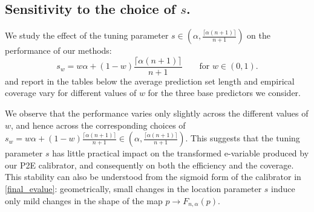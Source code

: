 \documentclass{article}
\theoremstyle{plain}
\theoremstyle{definition}
\theoremstyle{remark}
\begin{document}
\subsection{Sensitivity to the choice of \(s\).}
We study the effect of the tuning parameter
$s\in\left(\alpha,\frac{\lceil \alpha(n+1)\rceil}{n+1}\right)$
on the performance of our methods: 
\[
s_w
=
w\alpha
+
(1-w)
\frac{\lceil \alpha(n+1)\rceil}{n+1}\qquad \text{for \(w\in(0,1)\)}.
\]
and report in the tables below the average prediction set length and empirical coverage vary for different values of $w$ for the three base predictors we consider. 

We observe that the performance varies only slightly across the different values of \(w\), and hence across the corresponding choices of
$s_w
=
w\alpha
+
(1-w)\frac{\lceil \alpha(n+1)\rceil}{n+1}
\in
\left(\alpha,\frac{\lceil \alpha(n+1)\rceil}{n+1}\right).$
This suggests that the tuning parameter \(s\) has little practical impact on the transformed e-variable produced by our P2E calibrator, and consequently on both the efficiency and the coverage. This stability can also be understood from the sigmoid form of the calibrator in \eqref{final_evalue}: geometrically, small changes in the location parameter \(s\) induce only mild changes in the shape of the map $p\to F_{n,\alpha}(p)$.
\end{document}
